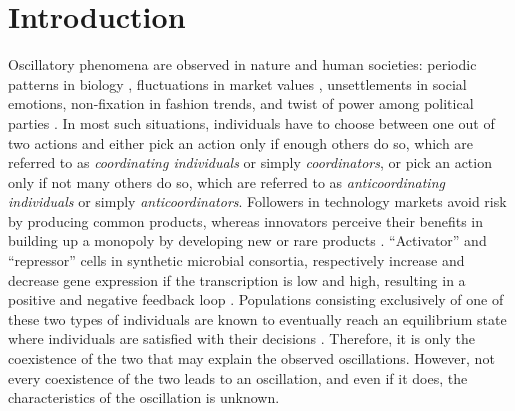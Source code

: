 \documentclass[10 pt,twocolumn,journal]{IEEEtran}
\theoremstyle{plain}
\theoremstyle{definition}
\begin{document}
\section{Introduction}
Oscillatory phenomena are observed in nature and human societies:
periodic patterns in biology \cite{hess2000periodic},
fluctuations in market values \cite{li2008gdp}, 
unsettlements in social emotions, 
non-fixation in fashion trends, and
twist of power among political parties \cite{lawrence1898oscillations}.
In most such situations, individuals have to choose between one out of two actions and either pick an action only if enough others do so, which are referred to as \emph{coordinating individuals} or simply \emph{coordinators}, or pick an action only if not many others do so, which are referred to as \emph{anticoordinating individuals} or simply \emph{anticoordinators}. 
Followers in technology markets avoid risk by producing common products, whereas innovators perceive their benefits in building up a monopoly by developing new or rare products \cite{helpman1992, collins2015}. 
``Activator'' and ``repressor'' cells in synthetic microbial consortia, respectively increase and decrease gene expression if the transcription is low and high, resulting in a positive and negative feedback loop \cite{chen2015emergent}.
Populations consisting exclusively of one of these two types of individuals are known to eventually reach an equilibrium state where individuals are satisfied with their decisions \cite{Ramazi2016a}. 
Therefore, it is only the coexistence of the two that may explain the observed oscillations.
However, not every coexistence of the two leads to an oscillation, and even if it does, the characteristics of the oscillation is unknown.  
\end{document}
